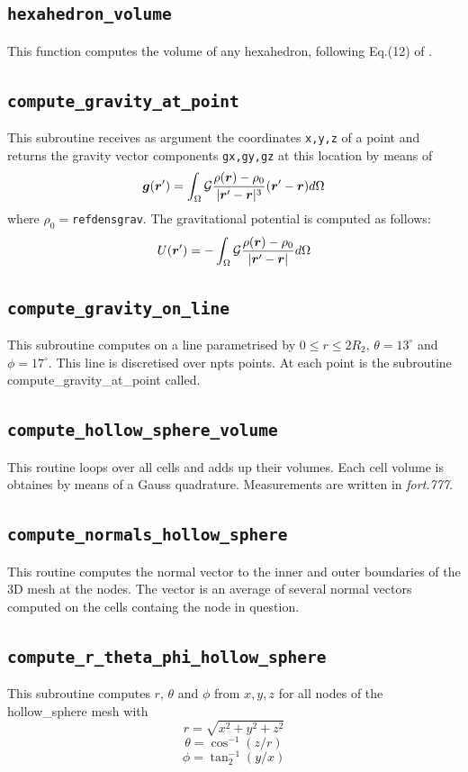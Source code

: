  \subsection{\tt hexahedron\_volume}
 This function computes the volume of any hexahedron, 
 following Eq.(12) of \cite{gran97}.
 \subsection{\tt compute\_gravity\_at\_point}
 This subroutine receives as argument the coordinates {\tt x,y,z} of a point and 
 returns the gravity vector components {\tt gx,gy,gz} at this location 
 by means of 
 \[
 {\bm g}({\bm r}') = \int_\Omega {\cal G} \frac{\rho({\bm r})-\rho_0}{|{\bm r}'-{\bm r}|^3} ({\bm r}'-{\bm r}) d\Omega
 \] 
 where $\rho_0=${\tt refdensgrav}.
 The gravitational potential is computed as follows:
 \[
 U({\bm r}') = -\int_\Omega {\cal G} \frac{\rho({\bm r})-\rho_0}{|{\bm r}'-{\bm r}|}  d\Omega
 \]
 \subsection{\tt compute\_gravity\_on\_line}
 This subroutine computes on a line parametrised by $0\leq r \leq 2R_2$,
 $\theta=13^\circ$ and $\phi=17^\circ$. This line is discretised 
 over npts points. At each point is the subroutine compute\_gravity\_at\_point called.
 \subsection{\tt compute\_hollow\_sphere\_volume}
 This routine loops over all cells and adds up their volumes. 
 Each cell volume is obtaines by means of a Gauss quadrature.
 Measurements are written in {\sl fort.777}. 
 \subsection{\tt compute\_normals\_hollow\_sphere}
 This routine computes the normal vector to the inner and outer boundaries of the 3D mesh
 at the nodes. 
 The vector is an average of several normal vectors computed on the cells containg the 
 node in question.
 \subsection{\tt compute\_r\_theta\_phi\_hollow\_sphere}
 This subroutine computes $r$, $\theta$ and $\phi$ from $x,y,z$ for all 
 nodes of the hollow\_sphere mesh with
 \[
 r=\sqrt{x^2+y^2+z^2}
 \]
 \[
 \theta=\cos^{-1}(z/r)
 \]
 \[
 \phi=\tan^{-1}_2 (y/x)
 \]
